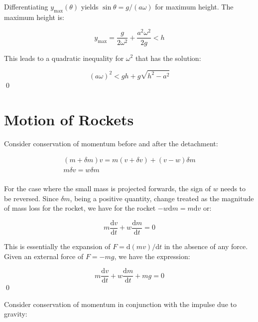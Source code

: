 \documentclass[12pt]{article}
\begin{document}
Differentiating $y_{\text{max}}(\theta)$ yields $\sin{\theta} = g/(a\omega)$ for maximum height. The maximum height is:

\begin{equation}
    y_{\text{max}} = \frac{g}{2\omega^{2}} + \frac{a^2 \omega^{2}}{2g} < h
\end{equation}

This leads to a quadratic inequality for $\omega^{2}$ that has the solution:

\begin{equation}
    (a\omega)^{2} < gh + g \sqrt{h^{2} - a^{2}}
\end{equation}
\qed


\pagebreak
\section*{Motion of Rockets}


Consider conservation of momentum before and after the detachment:

\begin{equation}
\begin{split}
    (m + \delta m)v = m(v + \delta v) + (v - w) \delta m \\
    m \delta v = w \delta m \\
\end{split}
\end{equation}

For the case where the small mass is projected forwards, the sign of $w$ needs to be reversed. Since $\delta m$, being a positive quantity, change treated as the magnitude of mass loss for the rocket, we have for the rocket $-w\mathrm{d}m = m \mathrm{d}v$ or:

\begin{equation}
    m \frac{\mathrm{d}v}{\mathrm{d}t} + w \frac{\mathrm{d}m}{\mathrm{d}t} = 0
\end{equation}

This is essentially the expansion of $F = \mathrm{d}(mv)/\mathrm{d}t$ in the absence of any force. Given an external force of $F = -mg$, we have the expression:

\begin{equation}
    m \frac{\mathrm{d}v}{\mathrm{d}t} + w \frac{\mathrm{d}m}{\mathrm{d}t} + mg = 0
\end{equation}
\qed


Consider conservation of momentum in conjunction with the impulse due to gravity:
\end{document}
